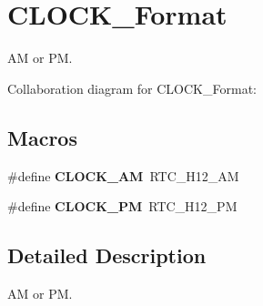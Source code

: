 \hypertarget{group___c_l_o_c_k___format}{}\section{C\+L\+O\+C\+K\+\_\+\+Format}
\label{group___c_l_o_c_k___format}


AM or PM.  


Collaboration diagram for C\+L\+O\+C\+K\+\_\+\+Format\+:
\subsection*{Macros}
\begin{DoxyCompactItemize}
\item 
\mbox{\label{group___c_l_o_c_k___format_gae4cd6ada23b2e1749a2fd828cba94f5a}} 
\#define {\bfseries C\+L\+O\+C\+K\+\_\+\+AM}~R\+T\+C\+\_\+\+H12\+\_\+\+AM
\item 
\mbox{\label{group___c_l_o_c_k___format_ga8978739eedb215b454cc9615031685d9}} 
\#define {\bfseries C\+L\+O\+C\+K\+\_\+\+PM}~R\+T\+C\+\_\+\+H12\+\_\+\+PM
\end{DoxyCompactItemize}


\subsection{Detailed Description}
AM or PM. 

